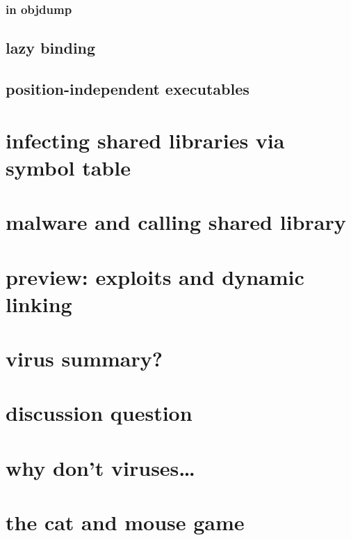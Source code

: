\subsubsection{in objdump}


\subsection{lazy binding}


\subsection{position-independent executables}


\section{infecting shared libraries via symbol table}

\section{malware and calling shared library}


\section{preview: exploits and dynamic linking}


\section{virus summary?}


\section{discussion question}


\section{why don't viruses\ldots}


\section{the cat and mouse game}


